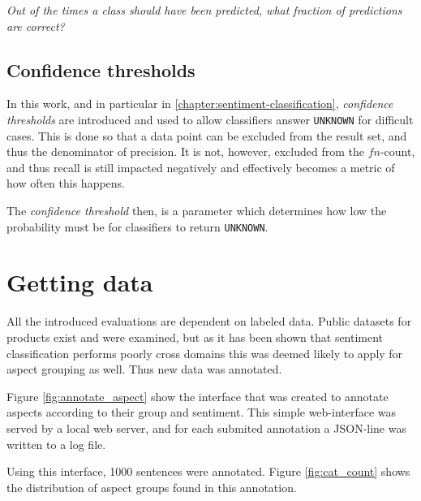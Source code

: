 \documentclass[a4paper,11pt]{kth-mag}
\begin{document}
\emph{Out of the times a class should have been predicted, what fraction of predictions are correct?}


\subsection{Confidence thresholds}
In this work, and in particular in \ref{chapter:sentiment-classification}, \emph{confidence thresholds} are
introduced and used to allow classifiers answer \texttt{UNKNOWN} for difficult cases.
This is done so that a data point can be excluded from the result set, and thus the denominator of precision.
It is not, however, excluded from the $fn$-count, and thus recall is still impacted negatively and effectively
becomes a metric of how often this happens.

The \emph{confidence threshold} then, is a parameter which determines how low the probability
must be for classifiers to return \texttt{UNKNOWN}.

\clearpage

\section{Getting data}
\label{subsec:getting_data}

All the introduced evaluations are dependent on labeled data. Public datasets for products exist and were examined,
but as it has been shown that sentiment classification performs poorly cross domains\cite{aue2005customizing}
this was deemed likely to apply for aspect grouping as well. Thus new data was annotated.

Figure \ref{fig:annotate_aspect} show the interface that was created to annotate aspects
according to their group and sentiment. This simple web-interface was served by a local web server,
and for each submited annotation a JSON-line was written to a log file.

Using this interface, 1000 sentences were annotated.
Figure \ref{fig:cat_count} shows the distribution of aspect groups found in this annotation.
\end{document}
